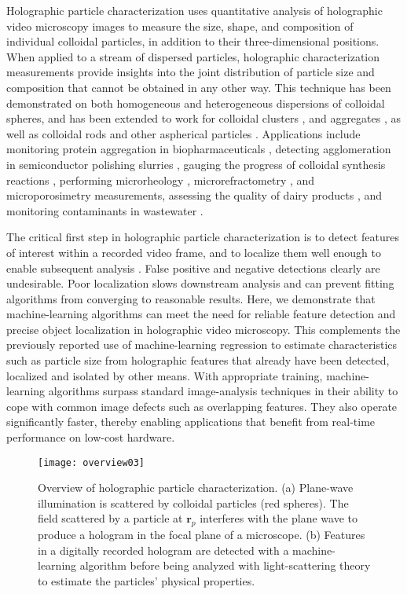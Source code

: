 \documentclass[10pt,letterpaper]{article}
\renewcommand{\vec}[1]{\mathbf{#1}}
\begin{document}
Holographic particle characterization \cite{lee07a} uses 
quantitative analysis of holographic video microscopy images to 
measure the size, shape, and composition of individual colloidal
particles, in addition to their three-dimensional positions.
When applied to a stream of dispersed particles, holographic
characterization measurements provide insights into the
joint distribution of particle size and composition
that cannot be obtained in any other way.
This technique has been demonstrated on both homogeneous
and heterogeneous \cite{yevick14,philips17}
dispersions of colloidal spheres, and has been extended to work for 
colloidal clusters \cite{perry12,fung12,fung13}, and aggregates 
\cite{wang16,wang16a}, as well as colloidal rods \cite{cheong10} 
and other aspherical particles \cite{wang14using,hannel15}.
Applications include
monitoring protein aggregation in biopharmaceuticals \cite{wang16},
detecting agglomeration in semiconductor polishing slurries
\cite{cheong17}, 
gauging the progress of colloidal synthesis reactions \cite{wang15,wang15a},
performing microrheology \cite{cheong08}, 
microrefractometry \cite{shpaisman12}, 
and microporosimetry \cite{cheong11} measurements,
assessing the quality of dairy products \cite{cheong09a},
and monitoring contaminants 
in wastewater \cite{philips17}.

The critical first step in holographic particle characterization
is to detect features of interest within a recorded video frame,
and to localize them well enough to enable subsequent 
analysis  \cite{crocker96,cheong09,yevick14,krishnatreya14a}.
False positive and negative detections clearly are undesirable.
Poor localization slows downstream analysis
\cite{yevick14,krishnatreya14a} and can prevent fitting algorithms 
from converging to reasonable results.
Here, we demonstrate that machine-learning algorithms can meet the
need for reliable feature detection and precise object localization in
holographic video microscopy.
This complements the previously reported \cite{yevick14}
use of machine-learning regression to estimate
characteristics such as particle size from holographic
features that already have been detected, localized
and isolated by other means.
With appropriate training, machine-learning algorithms
surpass standard image-analysis
techniques in their ability to cope with common image defects
such as overlapping features.
They also operate significantly faster, thereby enabling
applications that benefit from real-time performance on low-cost
hardware.

\begin{figure}[b!]
  \centering
  \texttt{[image: overview03]}	
  \caption{Overview of holographic particle characterization. (a) Plane-wave 
  illumination is scattered by colloidal particles (red spheres). The 
  field scattered by a particle at $\vec{r}_p$ interferes with the plane wave
  to produce a hologram in the focal
  plane of a microscope.
  (b) Features in a digitally recorded hologram are
  detected with a machine-learning algorithm before being
  analyzed with light-scattering 
  theory to estimate the particles' physical properties.}
  \label{fig:characterization}
\end{figure}
\end{document}
